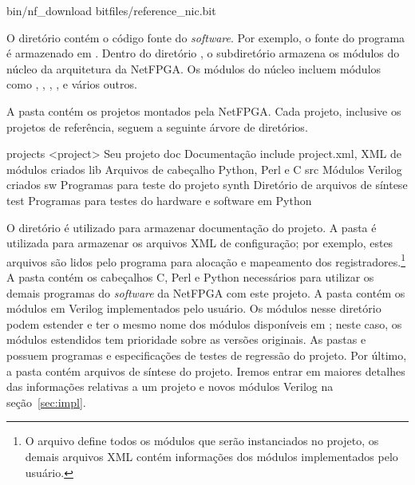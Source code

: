 \begin{verbnobox}
bin/nf_download bitfiles/reference_nic.bit
\end{verbnobox}

O diretório  contém o código fonte do \emph{software}.  Por
exemplo, o fonte do programa  é armazenado em
.  Dentro do diretório , o
subdiretório  armazena os módulos do núcleo da
arquitetura da NetFPGA.  Os módulos do núcleo incluem módulos como
, , ,
,  e vários outros.

A pasta  contém os projetos montados pela NetFPGA.  Cada
projeto, inclusive os projetos de referência, seguem a seguinte árvore
de diretórios.

\begin{verbnobox}[\footnotesize]
   projects
      <project>        {Seu projeto}
         doc           {Documentação}
         include       {project.xml, XML de módulos criados}
         lib           {Arquivos de cabeçalho Python, Perl e C}
         src           {Módulos Verilog criados}
         sw            {Programas para teste do projeto}
         synth         {Diretório de arquivos de síntese}
         test          {Programas para testes do hardware e software em Python}
\end{verbnobox}

O diretório  é utilizado para armazenar documentação do
projeto.  A pasta  é utilizada para armazenar os arquivos
XML de configuração; por exemplo, estes arquivos são lidos pelo programa
 para alocação e mapeamento dos
registradores.\footnote{O arquivo  define
todos os módulos que serão instanciados no projeto, os demais arquivos
XML contém informações dos módulos implementados pelo usuário.}  A pasta
 contém os cabeçalhos C, Perl e Python necessários para
utilizar os demais programas do \emph{software} da NetFPGA com este
projeto.\footnotemark{} A pasta  contém os módulos em Verilog
implementados pelo usuário.  Os módulos nesse diretório podem estender e
ter o mesmo nome dos módulos disponíveis em
; neste caso, os módulos estendidos tem
prioridade sobre as versões originais.  As pastas  e 
possuem programas e especificações de testes de regressão do projeto.
Por último, a pasta  contém arquivos de síntese do projeto.
Iremos entrar em maiores detalhes das informações relativas a um projeto
e novos módulos Verilog na seção~\ref{sec:impl}.

